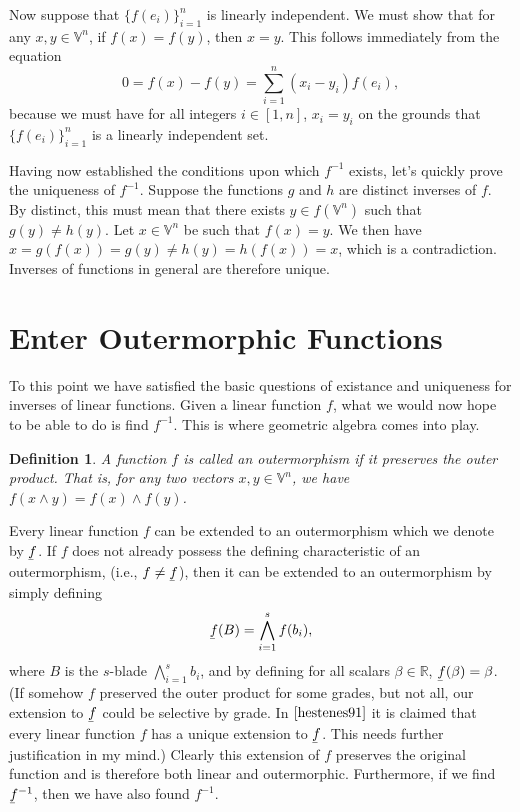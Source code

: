 \documentclass[12pt]{article}
\newcommand{\V}{\mathbb{V}}
\newcommand{\R}{\mathbb{R}}
\newcommand{\uf}{\underaccent{\bar}{f}}
\newtheorem{definition}{Definition}[section]
\begin{document}
Now suppose that $\{f(e_i)\}_{i=1}^n$ is linearly independent.  We must show
that for any $x,y\in\V^n$, if $f(x)=f(y)$, then $x=y$.  This follows immediately
from the equation
\begin{equation*}
0 = f(x)-f(y) = \sum_{i=1}^n(x_i-y_i)f(e_i),
\end{equation*}
because we must have for all integers $i\in[1,n]$, $x_i=y_i$ on the grounds
that $\{f(e_i)\}_{i=1}^n$ is a linearly independent set.

Having now established the conditions upon which $f^{-1}$ exists, let's quickly
prove the uniqueness of $f^{-1}$.  Suppose the functions $g$ and $h$ are
distinct inverses of $f$.  By distinct, this must mean that there exists $y\in f(\V^n)$
such that $g(y)\neq h(y)$.  Let $x\in\V^n$ be such that $f(x)=y$.  We then
have $x=g(f(x))=g(y)\neq h(y)=h(f(x))=x$, which is a contradiction.
Inverses of functions in general are therefore unique.

\section{Enter Outermorphic Functions}

To this point we have satisfied the basic questions of existance and uniqueness
for inverses of linear functions.  Given a linear function $f$, what we
would now hope to be able to do is find $f^{-1}$.
This is where geometric algebra comes into play.
\begin{definition}
A function $f$ is called an outermorphism if it preserves
the outer product.  That is, for any two vectors $x,y\in\V^n$,
we have $f(x\wedge y)=f(x)\wedge f(y)$.
\end{definition}
Every linear function $f$ can be extended to an outermorphism which
we denote by $\uf$.  If $f$ does not already possess the defining
characteristic of an outermorphism, (i.e., $f\neq\uf$), then it can be
extended to an outermorphism by simply defining
\begin{equation*}
\uf(B) = \bigwedge_{i=1}^s f(b_i),
\end{equation*}
where $B$ is the $s$-blade $\bigwedge_{i=1}^s b_i$, and by defining for all
scalars $\beta\in\R$, $\uf(\beta)=\beta$.  (If somehow $f$ preserved the outer
product for some grades, but not all, our extension to $\uf$ could be selective
by grade.  In $\cite{hestenes91}$ it is claimed that every linear function $f$ has a unique
extension to $\uf$.  This needs further justification in my mind.)
Clearly this extension of $f$ preserves the
original function and is therefore both linear and outermorphic.  Furthermore, if
we find $\uf^{-1}$, then we have also found $f^{-1}$.
\end{document}
